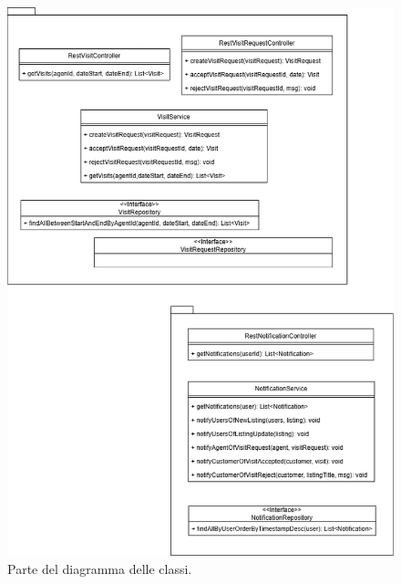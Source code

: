 \begin{figure}[H]
    \centering
    \includegraphics[width=\textwidth]{assets/diagrams/class-diagram/class-diagram-3.png}
    \caption{Parte del diagramma delle classi.}
    \label{fig:Parte 3 del diagramma delle classi}
\end{figure}

